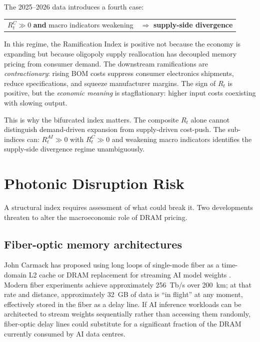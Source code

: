 \documentclass[12pt]{article}
\theoremstyle{definition}
\begin{document}
The 2025--2026 data introduces a fourth case:

\begin{center}
\begin{tabular}{ll}
$R_t^C \gg 0$ \textbf{and} macro indicators weakening & $\Rightarrow$ \textbf{supply-side divergence}
\end{tabular}
\end{center}

In this regime, the Ramification Index is positive not because the economy is expanding but because oligopoly supply reallocation has decoupled memory pricing from consumer demand. The downstream ramifications are \emph{contractionary}: rising BOM costs suppress consumer electronics shipments, reduce specifications, and squeeze manufacturer margins. The sign of $R_t$ is positive, but the \emph{economic meaning} is stagflationary: higher input costs coexisting with slowing output.

This is why the bifurcated index matters. The composite $R_t$ alone cannot distinguish demand-driven expansion from supply-driven cost-push. The sub-indices can: $R_t^{AI} \gg 0$ with $R_t^C \gg 0$ and weakening macro indicators identifies the supply-side divergence regime unambiguously.


\section{Photonic Disruption Risk}
\label{sec:photonic}

A structural index requires assessment of what could break it. Two developments threaten to alter the macroeconomic role of DRAM pricing.

\subsection{Fiber-optic memory architectures}

John Carmack has proposed using long loops of single-mode fiber as a time-domain L2 cache or DRAM replacement for streaming AI model weights \cite{Carmack2025,WakilPhotonic2026}. Modern fiber experiments achieve approximately 256~Tb/s over 200~km; at that rate and distance, approximately 32~GB of data is ``in flight'' at any moment, effectively stored in the fiber as a delay line. If AI inference workloads can be architected to stream weights sequentially rather than accessing them randomly, fiber-optic delay lines could substitute for a significant fraction of the DRAM currently consumed by AI data centres.
\end{document}

